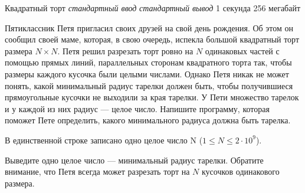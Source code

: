 \begin{problem}%
{Квадратный торт}%
{\textsl{стандартный ввод}}%
{\textsl{стандартный вывод}}%
{1 секунда}%
{256 мегабайт}{}

Пятиклассник Петя пригласил своих друзей на свой день рождения. Об этом он сообщил своей маме, которая, в свою очередь, испекла большой квадратный торт размера $N \times N$. Петя решил разрезать торт ровно на $N$ одинаковых частей с помощью прямых линий, параллельных сторонам квадратного торта так, чтобы размеры каждого кусочка были целыми числами. Однако Петя никак не может понять, какой минимальный радиус тарелки должен быть, чтобы получившиеся прямоугольные кусочки не выходили за края тарелки. У Пети множество тарелок и у каждой из них радиус — целое число. Напишите программу, которая поможет Пете определить, какого минимального радиуса должна быть тарелка.

\InputFile

В единственной строке записано одно целое число N ($1 \le N \le 2 \cdot 10^9$).

\OutputFile

Выведите одно целое число — минимальный радиус тарелки. Обратите внимание, что Петя всегда может разрезать торт на $N$ кусочков одинакового размера.

\Examples

\begin{example}
%
%
\end{example}
\end{problem}
